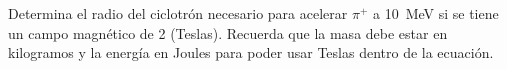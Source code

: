 \documentclass[./../main.tex]{subfiles}
\begin{document}
    \begin{exercise}
        Determina el radio del ciclotrón necesario para acelerar \(\pi^{+}\) a \SI{10}{\MeV} si se tiene un campo magnético de \SI{2}{\T} (Teslas). Recuerda que la masa debe estar en kilogramos y la energía en Joules para poder usar Teslas dentro de la ecuación.
    \end{exercise}
\end{document}
